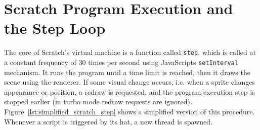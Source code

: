 \section{Scratch Program Execution and the Step Loop}
\label{sec:scratch_program_execution_and_the_step_loop}

The core of Scratch's virtual machine is a function called \texttt{step},
which is called at a constant frequency of 30 times per second using JavaScripts \texttt{setInterval} mechanism.
It runs the program until a time limit is reached, then it draws the scene using the renderer.
If some visual change occurs, i.e. when a sprite changes appearance or position, a redraw is requested,
and the program execution step is stopped earlier (in turbo mode redraw requests are ignored).
Figure~\ref{lst:simplified_scratch_step} shows a simplified version of this procedure.
Whenever a script is triggered by its hat, a new thread is spawned.
\parspace

